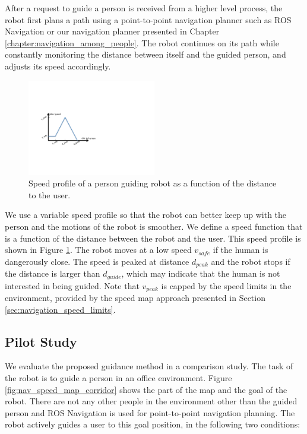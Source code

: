 After a request to guide a person is received from a higher level process, the robot first plans a path using a point-to-point navigation planner such as ROS Navigation or our navigation planner presented in Chapter \ref{chapter:navigation_among_people}. The robot continues on its path while constantly monitoring the distance between itself and the guided person, and adjusts its speed accordingly.


\begin{figure}[ht!]
\centering
\includegraphics[width=0.5\textwidth]{pics/speed_profile_cropped}
\caption{Speed profile of a person guiding robot as a function of the distance to the user.}
\label{fig:guidance_speed_profile}
\end{figure}


We use a variable speed profile so that the robot can better keep up with the person and the motions of the robot is smoother. We define a speed function that is a function of the distance between the robot and the user. This speed profile is shown in Figure \ref{fig:guidance_speed_profile}. The robot moves at a low speed $v_{safe}$ if the human is dangerously close. The speed is peaked at distance $d_{peak}$ and the robot stops if the distance is larger than $d_{guide}$, which may indicate that the human is not interested in being guided. Note that $v_{peak}$ is capped by the speed limits in the environment, provided by the speed map approach presented in Section \ref{sec:navigation_speed_limits}.

\subsection{Pilot Study}

We evaluate the proposed guidance method in a comparison study. The task of the robot is to guide a person in an office environment. Figure \ref{fig:nav_speed_map_corridor} shows the part of the map and the goal of the robot. There are not any other people in the environment other than the guided person and ROS Navigation is used for point-to-point navigation planning. The robot actively guides a user to this goal position, in the following two conditions:

